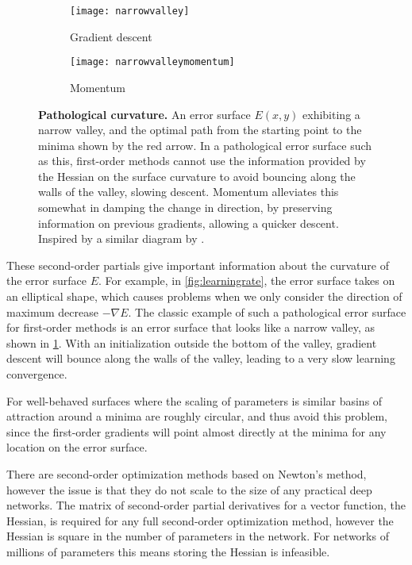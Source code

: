 \documentclass[thesis]{subfiles}
\begin{document}
\begin{figure}[tbp]
\centering
\begin{subfigure}[b]{0.45\textwidth}
\texttt{[image: narrowvalley]}
\caption{Gradient descent}\label{fig:narrowvalleysgd}
\end{subfigure}
\begin{subfigure}[b]{0.45\textwidth}
\texttt{[image: narrowvalleymomentum]}
\caption{Momentum}\label{fig:narrowvalleymomentum}
\end{subfigure}
\caption[Pathological curvature]{\textbf{Pathological curvature.} An error surface $E(x, y)$ exhibiting a narrow valley, and the optimal path from the starting point to the minima shown by the red arrow. In a pathological error surface such as this, first-order methods cannot use the information provided by the Hessian on the surface curvature to avoid bouncing along the walls of the valley, slowing descent. Momentum alleviates this somewhat in damping the change in direction, by preserving information on previous gradients, allowing a quicker descent. Inspired by a similar diagram by \citet{martens2010deep}.}
\label{fig:pathological}
\end{figure}
These second-order partials give important information about the curvature of the error surface $E$. For example, in \cref{fig:learningrate}, the error surface takes on an elliptical shape, which causes problems when we only consider the direction of maximum decrease $-\nabla E$. The classic example of such a pathological error surface for first-order methods is an error surface that looks like a narrow valley, as shown in \cref{fig:narrowvalleysgd}. With an initialization outside the bottom of the valley, gradient descent will bounce along the walls of the valley, leading to a very slow learning convergence.

For well-behaved surfaces where the scaling of parameters is similar
basins of attraction around a minima are roughly circular, and thus avoid this problem, since the first-order gradients will point almost directly at the minima for any location on the error surface.

There are second-order optimization methods based on Newton's method, however the issue is that they do not scale to the size of any practical deep networks. The matrix of second-order partial derivatives for a vector function, the Hessian, is required for any full second-order optimization method, however the Hessian is square in the number of parameters in the network. For networks of millions of parameters this means storing the Hessian is infeasible.
\end{document}
